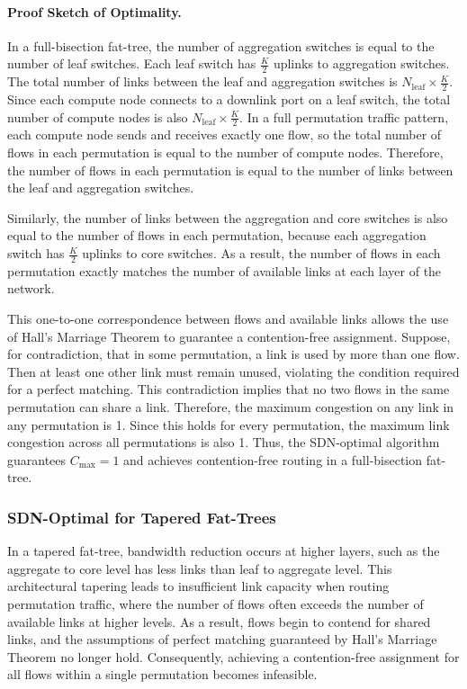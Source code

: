 \paragraph{Proof Sketch of Optimality.}

In a full-bisection fat-tree, the number of aggregation switches is equal to the number of leaf switches. Each leaf switch has \( \frac{K}{2} \) uplinks to aggregation switches. The total number of links between the leaf and aggregation switches is \( N_{\text{leaf}} \times \frac{K}{2} \). Since each compute node connects to a downlink port on a leaf switch, the total number of compute nodes is also \( N_{\text{leaf}} \times \frac{K}{2} \). In a full permutation traffic pattern, each compute node sends and receives exactly one flow, so the total number of flows in each permutation is equal to the number of compute nodes. Therefore, the number of flows in each permutation is equal to the number of links between the leaf and aggregation switches.

Similarly, the number of links between the aggregation and core switches is also equal to the number of flows in each permutation, because each aggregation switch has \( \frac{K}{2} \) uplinks to core switches. As a result, the number of flows in each permutation exactly matches the number of available links at each layer of the network.

This one-to-one correspondence between flows and available links allows the use of Hall’s Marriage Theorem to guarantee a contention-free assignment. Suppose, for contradiction, that in some permutation, a link is used by more than one flow. Then at least one other link must remain unused, violating the condition required for a perfect matching. This contradiction implies that no two flows in the same permutation can share a link. Therefore, the maximum congestion on any link in any permutation is 1. Since this holds for every permutation, the maximum link congestion across all permutations is also 1. Thus, the SDN-optimal algorithm guarantees \( C_{\text{max}} = 1 \) and achieves contention-free routing in a full-bisection fat-tree.

\subsubsection{SDN-Optimal for Tapered Fat-Trees}

In a tapered fat-tree, bandwidth reduction occurs at higher layers, such as the aggregate to core level has less links than leaf to aggregate level. This architectural tapering leads to insufficient link capacity when routing permutation traffic, where the number of flows often exceeds the number of available links at higher levels. As a result, flows begin to contend for shared links, and the assumptions of perfect matching guaranteed by Hall’s Marriage Theorem no longer hold. Consequently, achieving a contention-free assignment for all flows within a single permutation becomes infeasible.

